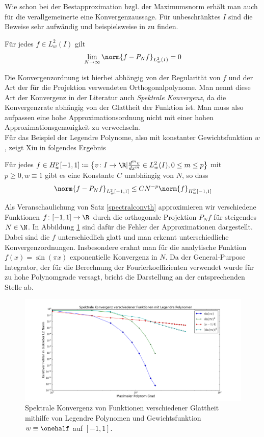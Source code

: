 Wie schon bei der Bestapproximation bzgl. der Maximumsnorm erhält man auch für die verallgemeinerte eine Konvergenzaussage. Für unbeschränktes $I$ sind die Beweise sehr aufwändig und beispielsweise in \autocite{CouHil53} zu finden. 
\begin{maththeorem}
Für jedes $f\in L_w^2(I)$ gilt
\[\lim\limits_{N\to\infty}\norm{f-P_Nf}_{L_w^2(I)}=0\]
\end{maththeorem}
Die Konvergenzordnung ist hierbei abhängig von der Regularität von $f$ und der Art der für die Projektion verwendeten Orthogonalpolynome. Man nennt diese Art der Konvergenz in der Literatur auch \emph{Spektrale Konvergenz}, da die Konvergenzrate abhängig von der Glattheit der Funktion ist. Man muss also aufpassen eine hohe Approximationsordnung nicht mit einer hohen Approximationsgenauigkeit zu verwechseln.\\
Für das Beispiel der Legendre Polynome, also mit konstanter Gewichtsfunktion $w$, zeigt Xiu in \autocite[Theorem 3.6]{dongbinxiu2010} folgendes Ergebnis
\begin{maththeorem}
\label{spectralconvth}
Für jedes $f\in H_w^p[-1,1]\coloneqq \left\lbrace v\colon I\to\R | \frac{d^mv}{dx^m}\in L_w^2(I),0\le m\le p\right\rbrace$ mit $p\ge 0, w\equiv 1$ gibt es eine Konstante $C$ unabhängig von $N$, so dass
\[\norm{f-P_Nf}_{L_w^2[-1,1]}\le CN^{-p}\norm{f}_{H_w^p[-1,1]}\]
\end{maththeorem}
\begin{mathbsp}
Als Veranschaulichung von Satz \ref{spectralconvth} approximieren wir verschiedene Funktionen $f\colon [-1,1]\to\R$ durch die orthogonale Projektion $P_Nf$ für steigendes $N\in\N$. In Abbildung \ref{figurespectralconverg} sind dafür die Fehler der Approximationen dargestellt. Dabei sind die $f$ unterschiedlich glatt und man erkennt unterschiedliche Konvergenzordnungen. Insbesondere erahnt man für die analytische Funktion $f(x)=\sin(\pi x)$ exponentielle Konvergenz in $N$. Da der General-Purpose Integrator, der für die Berechnung der Fourierkoeffizienten verwendet wurde für zu hohe Polynomgrade versagt, bricht die Darstellung an der entsprechenden Stelle ab.
\begin{figure}[h]
\includegraphics[width=\textwidth]{Figures/spectral_convergence_legendre.png}
\caption{Spektrale Konvergenz von Funktionen verschiedener Glattheit mithilfe von Legendre Polynomen und Gewichtsfunktion $w\equiv \onehalf$ auf $[-1,1]$.}
\label{figurespectralconverg}
\end{figure}
\end{mathbsp}

